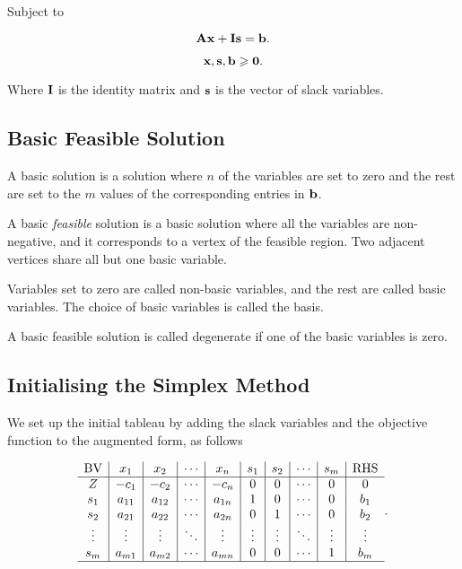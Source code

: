 \documentclass{report}
\begin{document}
Subject to

\[
	\vb{A}\vb{x} + \vb{I}\vb{s} = \vb{b}
	.\]

\[
	\vb{x}, \vb{s}, \vb{b} \geqslant \vb{0}
	.\]

Where $\vb{I}$ is the identity matrix and $\vb{s}$ is the vector of slack variables.

\subsection{Basic Feasible Solution}

A basic solution is a solution where $n$ of the variables are set to zero and the rest are set to the $m$ values of the corresponding entries in $\vb{b}$.

A basic \emph{feasible} solution is a basic solution where all the variables are non-negative, and it corresponds to a vertex of the feasible region. Two adjacent vertices share all but one basic variable.

Variables set to zero are called non-basic variables, and the rest are called basic variables. The choice of basic variables is called the basis.

A basic feasible solution is called degenerate if one of the basic variables is zero.

\subsection{Initialising the Simplex Method}

We set up the initial tableau by adding the slack variables and the objective function to the augmented form, as follows

\[
	\begin{array}{c|c|c|c|c|c|c|c|c|c}
		\text{BV} & x_1    & x_2    & \cdots & x_n    & s_1    & s_2    & \cdots & s_m    & \text{RHS} \\
		\hline
		Z         & -c_1   & -c_2   & \cdots & -c_n   & 0      & 0      & \cdots & 0      & 0          \\
		s_1       & a_{11} & a_{12} & \cdots & a_{1n} & 1      & 0      & \cdots & 0      & b_1        \\
		s_2       & a_{21} & a_{22} & \cdots & a_{2n} & 0      & 1      & \cdots & 0      & b_2        \\
		\vdots    & \vdots & \vdots & \ddots & \vdots & \vdots & \vdots & \ddots & \vdots & \vdots     \\
		s_m       & a_{m1} & a_{m2} & \cdots & a_{mn} & 0      & 0      & \cdots & 1      & b_m        \\
		\hline
	\end{array}
	.\]
\end{document}
